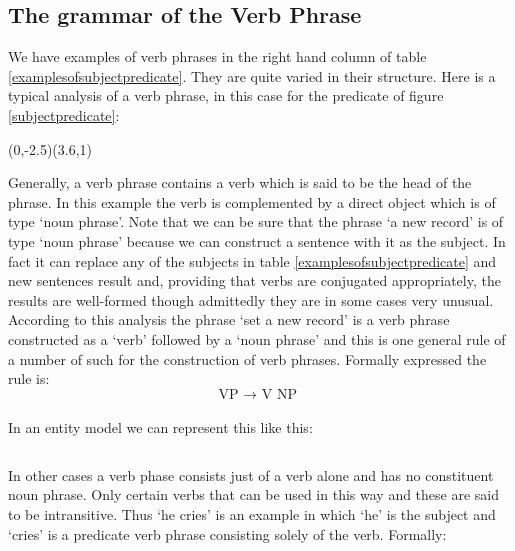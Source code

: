 \subsection {The grammar of the Verb Phrase}
We have examples of verb phrases in the right hand column of table \ref{examplesofsubjectpredicate}. They are quite varied in their structure. Here is a typical analysis of a verb phrase, in this case for the predicate of figure \ref{subjectpredicate}:
\begin{center}
\begin{minipage}{3.6cm}
\pspicture(0,-2.5)(3.6,1)
{}
   {
   }
\endpspicture 
\end{minipage}
\end{center}

\noindent Generally, a verb phrase contains a verb which is said to be the head of the phrase. In this example the verb is complemented by a direct object which is of type `noun phrase'. Note that we can be sure that the phrase `a new record' is of type `noun phrase' because we can construct a sentence with it as the subject. In fact it can replace any of the subjects in table \ref{examplesofsubjectpredicate}  and new sentences result and, providing that verbs are conjugated appropriately, the results are well-formed though admittedly they are in some cases very unusual.  \\

\noindent According to this analysis the phrase `set a new record' is a verb phrase constructed as a `verb' followed by a `noun phrase' and this is one general rule of a number of such for the construction of verb phrases. Formally expressed the rule is:\\

\begin{equation}
\label{monoTransitiveRule}
\text{VP  $\longrightarrow$   V  NP }
\end{equation} \\

\noindent In an entity model we can represent this like this:

\begin{equation}
\text{}
\end{equation} 

\noindent In other cases a verb phase consists just of a verb alone and has no constituent noun phrase. Only certain verbs that can be used in this way and these are said to be intransitive. Thus `he cries' is an example in which `he' is the subject and `cries' is a predicate verb phrase consisting solely of the verb.
Formally:\\

